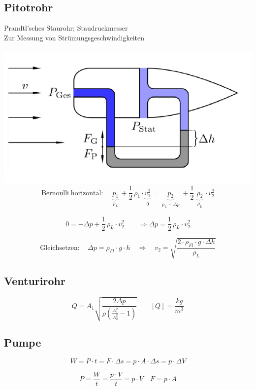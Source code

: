 \subsection{Pitotrohr}
Prandtl'sches Staurohr; Staudruckmesser \\
Zur Messung von Strümungsgeschwindigkeiten \\
\\
\includegraphics[width=0.7\linewidth]{Bilder/pitotrohr} \\

$$ \mathrm{Bernoulli \; horizontal:} \quad \boxed{  \underbrace{p_1}_{\substack{p_L}} + \frac{1}{2} \, \rho_1 \cdot \underbrace{v_1^2}_{\substack{0}} =  \underbrace{p_2}_{\substack{p_L - \Delta p}} + \frac{1}{2} \, \underbrace{\rho_2}_{\substack{\rho_L}} \cdot v_2^2} $$

$$ 0 = - \Delta p + \frac{1}{2} \, \rho_L \cdot v_2^2 \qquad \Rightarrow \Delta p =\frac{1}{2} \, \rho_L \cdot v_2^2 $$

$$ \mathrm{Gleichsetzen: } \quad \Delta p = \rho_{Fl} \cdot g \cdot h \quad \Rightarrow \quad v_2 = \sqrt{\frac{2 \cdot \rho_{Fl} \cdot g \cdot \Delta h}{\rho_L}} $$


\subsection{Venturirohr}
$$  \boxed{ Q = A_1 \sqrt{\frac{2 \Delta p}{\rho \left( \frac{A_1^2}{A_2^2} - 1\right)}}  \quad \quad [Q] = \frac{kg}{m^3} } $$


\subsection{Pumpe}
$$ \boxed{ W = P \cdot t = F \cdot \Delta s = p \cdot A \cdot \Delta s = p \cdot \Delta V }  $$

$$ \boxed{ P =  \frac{W}{t} = \frac{p \cdot V}{t} = p  \cdot  \dot{V} }  \quad  \boxed{ F = p \cdot A } $$





